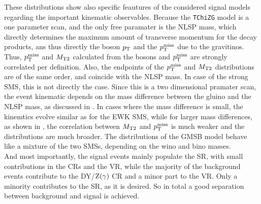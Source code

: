 These distributions show also specific feautures of the considered signal models regarding the important kinematic observables. Because the \texttt{TChiZG} model is a one parameter scan, and the only free paramater is the NLSP mass, which directly determines the maximum amount of transverse momentum for the decay products, ans thus directly the boson $p_{\mathrm{T}}$ and the $p_{\mathrm{T}}^\text{miss}$ due to the gravitinos. Thus, $p_{\mathrm{T}}^\text{miss}$ and $M_{\mathrm{T2}}$ calculated from the bosons and $p_{\mathrm{T}}^\text{miss}$ are strongly correlated per definition. Also, the endpoints of the $p_{\mathrm{T}}^\text{miss}$ and $M_{\mathrm{T2}}$ distributions are of the same order, and coincide with the NLSP mass. In case of the strong SMS, this is not directly the case. Since this is a two dimensional pramater scan, the event kinematic depends on the mass difference between the gluino and the NLSP mass, as discussed in . In cases where the mass difference is small, the kinemtics evolve similar as for the EWK SMS, while for larger mass differences, as shown in , the correlation between $M_{\mathrm{T2}}$ and $p_{\mathrm{T}}^\text{miss}$ is much weaker and the distributions are much broader. The distributions of the GMSB model behave like a mixture of the two SMSs, depending on the wino and bino masses.\\
And most importantly, the signal events mainly populate the SR, with small contributions in the CRs and the VR, while the majority of the background events contribute to the DY/$\mathrm{Z}(\gamma)$ CR and a minor part to the VR. Only a minority contributes to the SR, as it is desired. So in total a good separation between background and signal is achieved.

